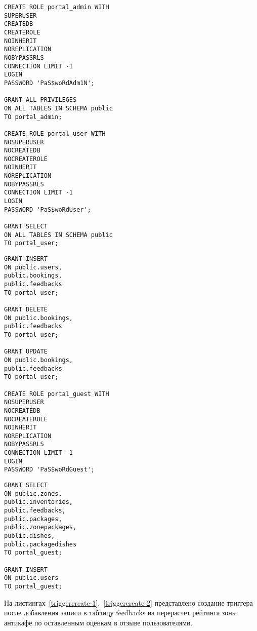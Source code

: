 \begin{center}
	\begin{lstlisting}[label=rolecreate-1, caption=Создание ролей и выдача прав доступа (часть 1)]		
CREATE ROLE portal_admin WITH
SUPERUSER
CREATEDB
CREATEROLE
NOINHERIT
NOREPLICATION
NOBYPASSRLS
CONNECTION LIMIT -1
LOGIN
PASSWORD 'PaS$woRdAdm1N';

GRANT ALL PRIVILEGES 
ON ALL TABLES IN SCHEMA public 
TO portal_admin;

CREATE ROLE portal_user WITH
NOSUPERUSER
NOCREATEDB
NOCREATEROLE
NOINHERIT
NOREPLICATION
NOBYPASSRLS
CONNECTION LIMIT -1
LOGIN
PASSWORD 'PaS$woRdUser';

GRANT SELECT
ON ALL TABLES IN SCHEMA public 
TO portal_user;

	\end{lstlisting}
\end{center}

\clearpage

\begin{center}
\begin{lstlisting}[label=rolecreate-2, caption=Создание ролей и выдача прав доступа (часть 2)]
GRANT INSERT
ON public.users, 
public.bookings, 
public.feedbacks
TO portal_user; 

GRANT DELETE
ON public.bookings, 
public.feedbacks
TO portal_user;
	
GRANT UPDATE
ON public.bookings,
public.feedbacks
TO portal_user; 

CREATE ROLE portal_guest WITH
NOSUPERUSER
NOCREATEDB
NOCREATEROLE
NOINHERIT
NOREPLICATION
NOBYPASSRLS
CONNECTION LIMIT -1
LOGIN
PASSWORD 'PaS$woRdGuest';

	\end{lstlisting}
\end{center}

\clearpage

\begin{center}
	\begin{lstlisting}[label=rolecreate-3, caption=Создание ролей и выдача прав доступа (часть 3)]
GRANT SELECT
ON public.zones,
public.inventories,
public.feedbacks,
public.packages,
public.zonepackages,
public.dishes,
public.packagedishes
TO portal_guest;

GRANT INSERT
ON public.users
TO portal_guest;
	\end{lstlisting}
\end{center}

На листингах~\ref{triggercreate-1},~\ref{triggercreate-2}  представлено создание триггера после добавления записи в таблицу feedbacks на перерасчет рейтинга зоны антикафе по оставленным оценкам в отзыве пользователями.

